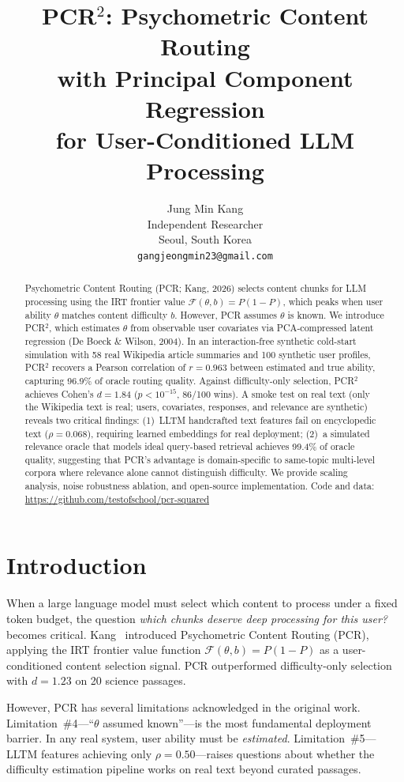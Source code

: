 \documentclass{article}
\title{PCR$^2$: Psychometric Content Routing\\with Principal Component Regression\\for User-Conditioned LLM Processing}
\author{
  Jung Min Kang \\
  Independent Researcher \\
  Seoul, South Korea \\
  \texttt{gangjeongmin23@gmail.com}
}
\begin{document}
\maketitle

\begin{abstract}
Psychometric Content Routing (PCR; Kang, 2026) selects content chunks for LLM processing using the IRT frontier value $\mathcal{F}(\theta, b)=P(1{-}P)$, which peaks when user ability $\theta$ matches content difficulty $b$. However, PCR assumes $\theta$ is known. We introduce PCR$^2$, which estimates $\theta$ from observable user covariates via PCA-compressed latent regression (De Boeck \& Wilson, 2004). In an interaction-free synthetic cold-start simulation with 58 real Wikipedia article summaries and 100 synthetic user profiles, PCR$^2$ recovers a Pearson correlation of $r=0.963$ between estimated and true ability, capturing 96.9\% of oracle routing quality. Against difficulty-only selection, PCR$^2$ achieves Cohen's $d=1.84$ ($p<10^{-15}$, 86/100 wins). A smoke test on real text (only the Wikipedia text is real; users, covariates, responses, and relevance are synthetic) reveals two critical findings: (1)~LLTM handcrafted text features fail on encyclopedic text ($\rho=0.068$), requiring learned embeddings for real deployment; (2)~a simulated relevance oracle that models ideal query-based retrieval achieves 99.4\% of oracle quality, suggesting that PCR's advantage is domain-specific to same-topic multi-level corpora where relevance alone cannot distinguish difficulty. We provide scaling analysis, noise robustness ablation, and open-source implementation. Code and data: \url{https://github.com/testofschool/pcr-squared}
\end{abstract}

\section{Introduction}

When a large language model must select which content to process under a fixed token budget, the question \emph{which chunks deserve deep processing for this user?} becomes critical. Kang~\cite{kang2026pcr} introduced Psychometric Content Routing (PCR), applying the IRT frontier value function $\mathcal{F}(\theta, b) = P(1{-}P)$ as a user-conditioned content selection signal. PCR outperformed difficulty-only selection with $d=1.23$ on 20 science passages.

However, PCR has several limitations acknowledged in the original work. Limitation~\#4---``$\theta$ assumed known''---is the most fundamental deployment barrier. In any real system, user ability must be \emph{estimated}. Limitation~\#5---LLTM features achieving only $\rho=0.50$---raises questions about whether the difficulty estimation pipeline works on real text beyond curated passages.
\end{document}
